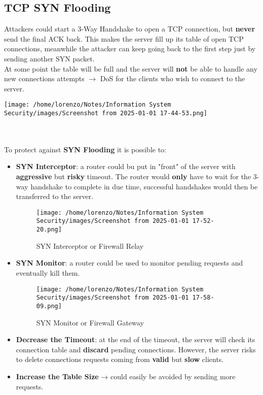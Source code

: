 \subsection{TCP SYN Flooding}
\begin{minipage}{0.6\textwidth}
Attackers could start a 3-Way Handshake to open a TCP connection, but \textbf{never} send the final
ACK back. This makes the server fill up its table of open TCP connections, meanwhile the
attacker can keep going back to the first step just by sending another SYN packet.\\
At some point the table will be full and the server will \textbf{not} be able to handle any new connections
attempts \(\rightarrow \) DoS for the clients who wish to connect to the server.
\end{minipage} 
\hspace{0.5cm}
\begin{minipage}{0.4\textwidth}
    \centering
    \texttt{[image: /home/lorenzo/Notes/Information System Security/images/Screenshot from 2025-01-01 17-44-53.png]}
\end{minipage}
\\
\\
To protect against \textbf{SYN Flooding} it is possible to:
\begin{itemize}
    \item \textbf{SYN Interceptor}: a router could bu put in "front" of the server with \textbf{aggressive} but
    \textbf{risky} timeout. The router would \textbf{only} have to wait for the 3-way handshake to complete
    in due time, successful handshakes would then be transferred to the server.
    \vspace{-0.3cm}
    \begin{figure}[H]
        \centering
        \texttt{[image: /home/lorenzo/Notes/Information System Security/images/Screenshot from 2025-01-01 17-52-20.png]}
        \caption{SYN Interceptor or Firewall Relay}
    \end{figure}
    \item \textbf{SYN Monitor}: a router could be used to monitor pending requests and eventually kill
    them.
    \begin{figure}[H]
        \centering
        \texttt{[image: /home/lorenzo/Notes/Information System Security/images/Screenshot from 2025-01-01 17-58-09.png]}
        \caption{SYN Monitor or Firewall Gateway}
    \end{figure}
    \item \textbf{Decrease the Timeout}: at the end of the timeout, the server will check its connection
    table and \textbf{discard} pending connections. However, the server risks to delete connections
    requests coming from \textbf{valid} but \textbf{slow} clients.
    \item \textbf{Increase the Table Size} → could easily be avoided by sending more requests.
\end{itemize}
